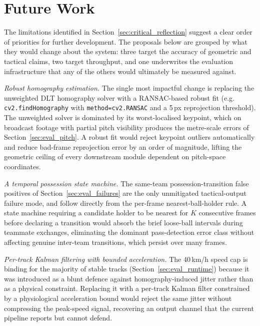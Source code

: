 \section{Future Work}
\label{sec:future_work}

The limitations identified in Section~\ref{sec:critical_reflection} suggest a clear
order of priorities for further development. The proposals below are grouped by what
they would change about the system: three target the accuracy of geometric and tactical
claims, two target throughput, and one underwrites the evaluation infrastructure that
any of the others would ultimately be measured against.

\textit{Robust homography estimation.} The single most impactful change is replacing
the unweighted DLT homography solver with a RANSAC-based robust fit (e.g.\\
\texttt{cv2.findHomography} with \texttt{method=cv2.RANSAC} and a 5\,px reprojection
threshold). The unweighted solver is dominated by its worst-localised keypoint,
which on broadcast footage with partial pitch visibility produces the metre-scale
errors of Section~\ref{sec:eval_pitch}. A robust fit would reject keypoint outliers
automatically and reduce bad-frame reprojection error by an order of magnitude,
lifting the geometric ceiling of every downstream module dependent on pitch-space
coordinates.

\textit{A temporal possession state machine.} The same-team possession-transition
false positives of Section~\ref{sec:eval_failures} are the only unmitigated
tactical-output failure mode, and follow directly from the per-frame
nearest-ball-holder rule. A state machine requiring a candidate holder to be
nearest for $K$ consecutive frames before declaring a transition would absorb the
brief loose-ball intervals during teammate exchanges, eliminating the dominant
pass-detection error class without affecting genuine inter-team transitions, which
persist over many frames.

\textit{Per-track Kalman filtering with bounded acceleration.} The
40\,km/h speed cap is binding for the majority of stable tracks
(Section~\ref{sec:eval_runtime}) because it was introduced as a blunt defence against
homography-induced jitter rather than as a physical constraint. Replacing it with a
per-track Kalman filter constrained by a physiological acceleration bound would reject
the same jitter without compressing the peak-speed signal, recovering an output channel
that the current pipeline reports but cannot defend.

